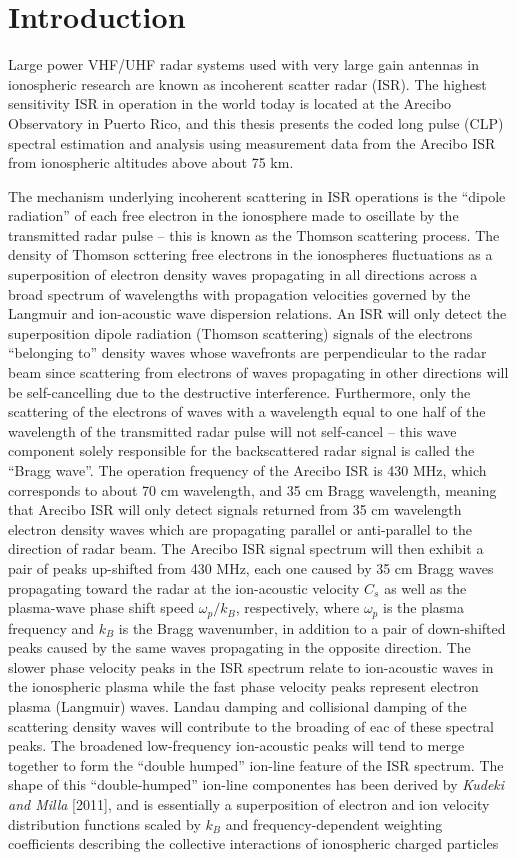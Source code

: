 \chapter{Introduction}
Large power VHF/UHF radar systems used with very large gain antennas in ionospheric research are known as incoherent scatter radar (ISR). The highest sensitivity ISR in operation in the world today is located at the Arecibo Observatory in Puerto Rico, and this thesis presents the coded long pulse (CLP) spectral estimation and analysis using measurement data from the Arecibo ISR from ionospheric altitudes above about 75 km.

The mechanism underlying incoherent scattering in ISR operations is the ``dipole radiation'' of each free electron in the ionosphere made to oscillate by the transmitted radar pulse -- this is known as the Thomson scattering process. The density of Thomson scttering free electrons in the ionospheres fluctuations as a superposition of electron density waves propagating in all directions across a broad spectrum of wavelengths with propagation velocities governed by the Langmuir and ion-acoustic wave dispersion relations. An ISR will only detect the superposition dipole radiation (Thomson scattering) signals of the electrons ``belonging to'' density waves whose wavefronts are perpendicular to the radar beam since scattering from electrons of waves propagating in other directions will be self-cancelling due to the destructive interference. Furthermore, only the scattering of the electrons of waves with a wavelength equal to one half of the wavelength of the transmitted radar pulse will not self-cancel -- this wave component solely responsible for the backscattered radar signal is called the ``Bragg wave''. The operation frequency of the Arecibo ISR is 430 MHz, which corresponds to about 70 cm wavelength, and 35 cm Bragg wavelength, meaning that Arecibo ISR will only detect signals returned from 35 cm wavelength electron density waves which are propagating parallel or anti-parallel to the direction of radar beam. The Arecibo ISR signal spectrum will then exhibit a pair of peaks up-shifted from 430 MHz, each one caused by 35 cm Bragg waves propagating toward the radar at the ion-acoustic velocity $C_s$ as well as the plasma-wave phase shift speed $\omega_p/k_B$, respectively, where $\omega_p$ is the plasma frequency and $k_B$ is the Bragg wavenumber, in addition to a pair of down-shifted peaks caused by the same waves propagating in the opposite direction. The slower phase velocity peaks in the ISR spectrum relate to ion-acoustic waves in the ionospheric plasma while the fast phase velocity peaks represent electron plasma (Langmuir) waves. Landau damping and collisional damping of the scattering density waves will contribute to the broading of eac of these spectral peaks. The broadened low-frequency ion-acoustic peaks will tend to merge together to form the ``double humped'' ion-line feature of the ISR spectrum. The shape of this ``double-humped'' ion-line componentes has been derived by \textit{Kudeki and Milla} [2011], and is essentially a superposition of electron and ion velocity distribution functions scaled by $k_B$ and frequency-dependent weighting coefficients describing the collective interactions of ionospheric charged particles 